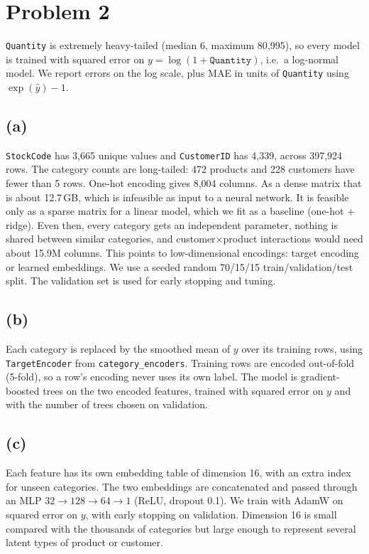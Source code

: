 \documentclass[11pt]{article}
\begin{document}
\section*{Problem 2}
\texttt{Quantity} is extremely heavy-tailed (median 6, maximum 80{,}995), so every model is trained with squared error on $y=\log(1+\texttt{Quantity})$,
i.e.\ a log-normal model. We report errors on the log scale, plus MAE in units of \texttt{Quantity} using $\exp(\hat y)-1$.

\subsection*{(a)}
\texttt{StockCode} has 3{,}665 unique values and \texttt{CustomerID} has 4{,}339, across 397{,}924 rows. The category counts are long-tailed: 472 products and 228 customers
have fewer than 5 rows. One-hot encoding gives 8{,}004 columns. As a dense matrix that is about 12.7\,GB, which is infeasible as input to a neural network. It is feasible only as a sparse matrix for a linear
model, which we fit as a baseline (one-hot + ridge). Even then, every category gets an independent parameter, nothing is shared between similar categories, and
customer$\times$product interactions would need about 15.9M columns. This points to low-dimensional encodings: target encoding or learned embeddings.
We use a seeded random 70/15/15 train/validation/test split. The validation set is used for early stopping and tuning.

\subsection*{(b)}
Each category is replaced by the smoothed mean of $y$ over its training rows, using \texttt{TargetEncoder} from \texttt{category\_encoders}. Training rows are encoded out-of-fold (5-fold), so
a row's encoding never uses its own label. The model is gradient-boosted trees on the two encoded features, trained with squared error on $y$ and with the number of trees chosen on validation.

\subsection*{(c)}
Each feature has its own embedding table of dimension 16, with an extra index for unseen categories. The two embeddings are concatenated and passed through an MLP
$32\to128\to64\to1$ (ReLU, dropout 0.1). We train with AdamW on squared error on $y$, with early stopping on validation. Dimension 16 is small compared with the
thousands of categories but large enough to represent several latent types of product or customer.
\end{document}
